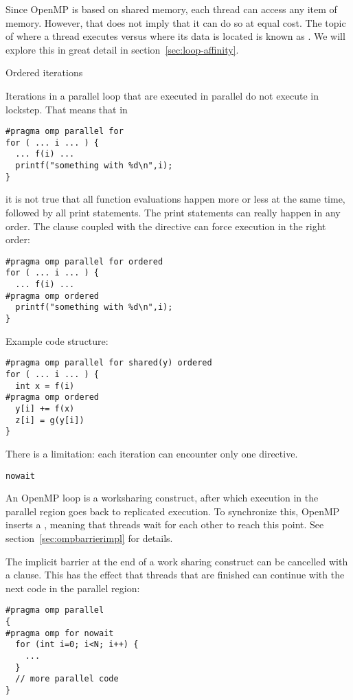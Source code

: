 Since OpenMP is based on shared memory, each thread
can access any item of memory.
However, that does not imply that it can do so at equal cost.
The topic of where a thread executes versus where its data is located
is known as .
We will explore this in great detail in section~\ref{sec:loop-affinity}.

 {Ordered iterations}
\label{sec:omp-ordered}

Iterations in a parallel loop that are executed in parallel do not
execute in lockstep. That means that in
\begin{lstlisting}
#pragma omp parallel for
for ( ... i ... ) {
  ... f(i) ...
  printf("something with %d\n",i);
}
\end{lstlisting}
it is not true that all function evaluations happen more or less at
the same time, followed by all print statements. The print statements
can really happen in any order. The  clause
coupled with the  directive can
force execution in the right order:
\begin{lstlisting}
#pragma omp parallel for ordered
for ( ... i ... ) {
  ... f(i) ...
#pragma omp ordered
  printf("something with %d\n",i);
}
\end{lstlisting}
Example code structure:
\begin{lstlisting}
#pragma omp parallel for shared(y) ordered
for ( ... i ... ) {
  int x = f(i)
#pragma omp ordered
  y[i] += f(x)
  z[i] = g(y[i])
}
\end{lstlisting}
There is a limitation:
each iteration can encounter only one  directive.

 {\texttt{nowait}}
\label{sec:omp-nowait}

An OpenMP loop is a worksharing construct,
after which execution in the parallel region goes back
to replicated execution.
To synchronize this, OpenMP inserts a ,
meaning that threads wait for each other to reach this point.
See section~\ref{sec:ompbarrierimpl} for details.

The implicit barrier at the end of a work sharing construct
can be cancelled with a
 clause.
This has the effect that threads that are finished can continue
with the next code in the parallel region:
\begin{lstlisting}
#pragma omp parallel
{
#pragma omp for nowait
  for (int i=0; i<N; i++) {
    ...
  }
  // more parallel code
}
\end{lstlisting}


